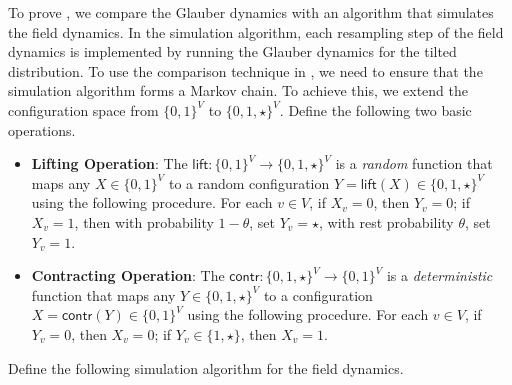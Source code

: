 \documentclass[11pt,a4paper]{article}
\theoremstyle{definition}
\begin{document}
To prove , we compare the Glauber dynamics with an algorithm that simulates the field dynamics. In the simulation algorithm, each resampling step of the field dynamics is implemented by running the Glauber dynamics for the tilted distribution.
To use the comparison technique in , we need to ensure that the simulation algorithm forms a Markov chain.
To achieve this, we extend the configuration space from $\{0,1\}^V$ to $\{0,1,\star\}^V$.
Define the following two basic operations.
\begin{itemize}
    \item \textbf{Lifting Operation}: The $\textsf{lift}:\{0,1\}^V \to \{0,1,\star\}^V$ is a \emph{random} function that maps any $X \in \{0,1\}^V$ to a random configuration $Y = \textsf{lift}(X) \in \{0,1,\star\}^V$ using the following procedure. For each $v \in V$, if $X_v = 0$, then $Y_v = 0$; if $X_v = 1$, then with probability $1-\theta$, set $Y_v = \star$, with rest probability $\theta$, set $Y_v = 1$.
    \item \textbf{Contracting Operation}: The $\textsf{contr}:\{0,1,\star\}^V \to \{0,1\}^V$ is a \emph{deterministic} function that maps any $Y \in \{0,1,\star\}^V$ to a configuration $X = \textsf{contr}(Y) \in \{0,1\}^V$ using the following procedure. For each $v \in V$, if $Y_v = 0$, then $X_v = 0$; if $Y_v \in \{1,\star\}$, then $X_v = 1$.
\end{itemize}
Define the following simulation algorithm for the field dynamics.
\end{document}
